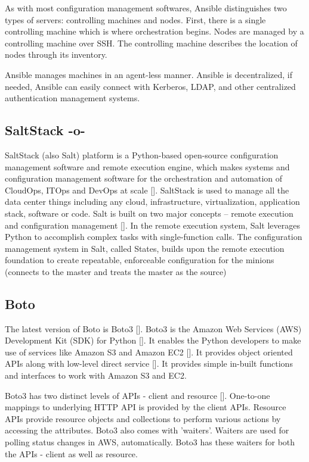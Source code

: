 As with most configuration management softwares, Ansible distinguishes
two types of servers: controlling machines and nodes. First, there is
a single controlling machine which is where orchestration
begins. Nodes are managed by a controlling machine over SSH. The
controlling machine describes the location of nodes through its
inventory.

Ansible manages machines in an agent-less manner. Ansible is
decentralized, if needed, Ansible can easily connect with Kerberos,
LDAP, and other centralized authentication management systems.



\subsection{SaltStack -o-}

SaltStack (also Salt) platform is a Python-based open-source
configuration management software and remote execution engine, which
makes systems and configuration management software for the
orchestration and automation of CloudOps, ITOps and DevOps at
scale [\cite{www-saltstack}]. SaltStack is used to manage all the data
center things including any cloud, infrastructure, virtualization,
application stack, software or code. Salt is built on two major
concepts -- remote execution and configuration
management [\cite{SaltStack-book}]. In the remote execution system, Salt
leverages Python to accomplish complex tasks with single-function
calls. The configuration management system in Salt, called States,
builds upon the remote execution foundation to create repeatable,
enforceable configuration for the minions (connects to the master and
treats the master as the source)


     
\subsection{Boto}

The latest version of Boto is Boto3 [\cite{www-boto}].  Boto3 is the
Amazon Web Services (AWS) Development Kit (SDK) for
Python [\cite{www-boto-github}]. It enables the Python developers to
make use of services like Amazon S3 and Amazon
EC2 [\cite{www-boto-amazon-python-sdk}].  It provides object oriented
APIs along with low-level direct service
 [\cite{www-boto3-documentation}].  It provides simple in-built
functions and interfaces to work with Amazon S3 and EC2.

Boto3 has two distinct levels of APIs - client and resource
 [\cite{www-boto-amazon-python-sdk}]. One-to-one mappings to underlying
HTTP API is provided by the client APIs. Resource APIs provide
resource objects and collections to perform various actions by
accessing the attributes.  Boto3 also comes with 'waiters'. Waiters
are used for polling status changes in AWS, automatically. Boto3 has
these waiters for both the APIs - client as well as resource.
     
